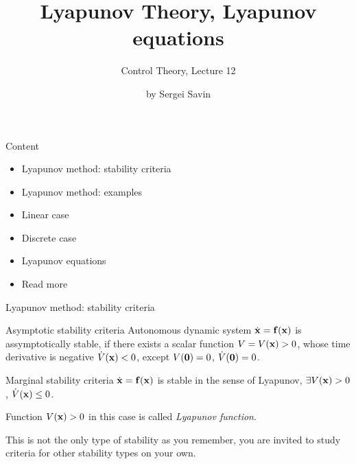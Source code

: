 \documentclass{beamer}
\title{Lyapunov Theory, Lyapunov equations}
\subtitle{Control Theory, Lecture 12}
\author{by Sergei Savin}
\date{\mydate}
\begin{document}
\maketitle


\begin{frame}{Content}

\begin{itemize}
\item Lyapunov method: stability criteria
\item Lyapunov method: examples
\item Linear case
\item Discrete case
\item Lyapunov equations
\item Read more
\end{itemize}

\end{frame}





\begin{frame}{Lyapunov method: stability criteria}
\begin{flushleft}

\begin{block}{Asymptotic stability criteria}
Autonomous dynamic system $\dot{\mathbf{x}} = \mathbf{f}(\mathbf{x})$ is assymptotically stable, if there exists a scalar function $V = V(\mathbf{x}) > 0$, whose time derivative is negative $\dot V(\mathbf{x}) < 0$, except $V(\mathbf{0}) = 0$, $\dot V(\mathbf{0}) = 0$.
\end{block}

\begin{block}{Marginal stability criteria}
$\dot{\mathbf{x}} = \mathbf{f}(\mathbf{x})$ is stable in the sense of Lyapunov, $\exists V(\mathbf{x}) > 0$, $\dot V(\mathbf{x}) \leq 0$.
\end{block}

\begin{definition}
Function $V(\mathbf{x}) > 0$ in this case is called \emph{Lyapunov function}.
\end{definition}

\bigskip

This is not the only type of stability as you remember, you are invited to study criteria for other stability types on your own.

\end{flushleft}
\end{frame}
\end{document}
